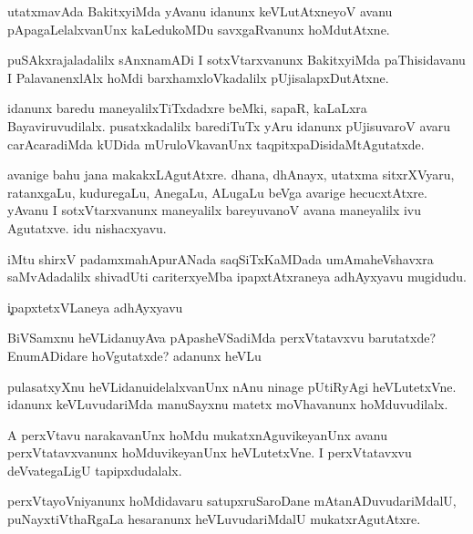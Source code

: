 \begin{mng}
utatxmavAda BakitxyiMda yAvanu idanunx keVLutAtxneyoV avanu pApagaLelalxvanUnx kaLedukoMDu savxgaRvanunx hoMdutAtxne.
\end{mng}

\begin{mng}
puSAkxrajaladalilx sAnxnamADi I sotxVtarxvanunx BakitxyiMda paThisidavanu I PalavanenxlAlx hoMdi barxhamxloVkadalilx pUjisalapxDutAtxne.
\end{mng}

\begin{mng}
idanunx baredu maneyalilxTiTxdadxre beMki, sapaR, kaLaLxra Bayaviruvudilalx. pusatxkadalilx barediTuTx yAru idanunx pUjisuvaroV avaru carAcaradiMda kUDida mUruloVkavanUnx taqpitxpaDisidaMtAgutatxde.
\end{mng}

\begin{mng}
avanige bahu jana makakxLAgutAtxre. dhana, dhAnayx, utatxma sitxrXVyaru, ratanxgaLu, kuduregaLu, AnegaLu, ALugaLu beVga avarige hecucxtAtxre. yAvanu I sotxVtarxvanunx maneyalilx bareyuvanoV avana maneyalilx ivu Agutatxve. idu nishacxyavu.
\end{mng}
iMtu shirxV padamxmahApurANada saqSiTxKaMDada umAmaheVshavxra saMvAdadalilx shivadUti cariterxyeMba ipapxtAtxraneya adhAyxyavu mugidudu.

\begin{mng}
\c{ipapxtetxVLaneya adhAyxyavu}
\end{mng}

\begin{mng}
BiVSamxnu heVLidanu\mdash yAva pApasheVSadiMda perxVtatavxvu barutatxde? EnumADidare hoVgutatxde? adanunx heVLu
\end{mng}

\begin{mng}
pulasatxyXnu heVLidanu\mdash idelalxvanUnx nAnu ninage pUtiRyAgi heVLutetxVne. idanunx keVLuvudariMda manuSayxnu matetx moVhavanunx hoMduvudilalx.
\end{mng}

\begin{mng}
A perxVtavu narakavanUnx hoMdu mukatxnAguvikeyanUnx avanu perxVtatavxvanunx hoMduvikeyanUnx heVLutetxVne. I perxVtatavxvu deVvategaLigU tapipxdudalalx.
\end{mng}

\begin{mng}
perxVtayoVniyanunx hoMdidavaru satupxruSaroDane mAtanADuvudariMdalU, puNayxtiVthaRgaLa hesaranunx heVLuvudariMdalU mukatxrAgutAtxre.
\end{mng}

